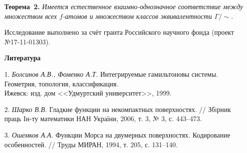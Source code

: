 \textbf{Теорема~2.} {\it Имеется естественное взаимно-однознач\-ное соответствие между множеством всех $f$-атомов и множеством классов эквивалентности $\mathfrak\Gamma/\sim$.}

Исследование выполнено за счёт гранта Российского научного фонда (проект №17-11-01303).

\smallskip \centerline{\bf Литература}\nopagebreak

1. {\it Болсинов А.В., Фоменко А.Т.} Интегрируемые гамильтоновы системы. Геометрия, топология, классификация.\\ Ижевск: изд. дом <<Удмуртский университет>>, 1999.

2. {\it Шарко В.В.} Гладкие функции на некомпактных поверхностях. // Збiрник праць Iн-ту математики НАН України, 2006, т. 3, № 3, с. 443--473.

3. {\it Ошемков А.А.} Функции Морса на двумерных поверхностях. Кодирование особенностей. // Труды МИРАН, 1994, т. 205, с. 131--140.

